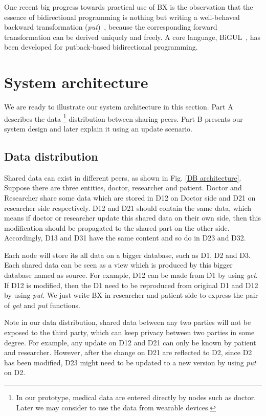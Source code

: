 \documentclass[conference]{IEEEtran}
\begin{document}
	One recent big progress towards practical use of BX is the observation that the essence of bidirectional programming is nothing but writing a well-behaved backward transformation (\emph{put})~\cite{hu2014validity, pacheco2014monadic, pacheco2014biflux}, because the corresponding forward transformation can be derived uniquely and freely. A core language, BiGUL~\cite{bigul}, has been developed for putback-based bidirectional programming.
    
\section{System architecture}
\label{system}
     We are ready to illustrate our system architecture in this section. Part A describes the data \footnote{
	 In our prototype, medical data are entered directly by nodes such as doctor. Later we may consider to use the data from wearable devices.} distribution between sharing peers. Part B presents our system design and later explain it using an update scenario.

\subsection{Data distribution}


Shared data can exist in different peers, as shown in Fig. \ref{DB architecture}. Suppose there are three entities, doctor, researcher and patient. Doctor and Researcher share some data which are stored in D12 on Doctor side and D21 on researcher side respectively. D12 and D21 should contain the same data, which means if doctor or researcher update this shared data on their own side, then this modification should be propagated to the shared part on the other side. Accordingly, D13 and D31 have the same content and so do in D23 and D32.

Each node will store its all data on a bigger database, such as D1, D2 and D3. Each shared data can be seen as a view which is produced by this bigger database named as source. For example, D12 can be made from D1 by using \emph{get}. If D12 is modified, then the D1 need to be reproduced from original D1 and D12 by using \emph{put}. We just write BX in researcher and patient side to express the pair of \emph{get} and \emph{put} functions.

Note in our data distribution, shared data between any two parties will not be exposed to the third party, which can keep privacy between two parties in some degree. For example, any update on D12 and D21 can only be known by patient and researcher. However, after the change on D21 are reflected to D2, since D2 has been modified, D23 might need to be updated to a new version by using \emph{put} on D2.
\end{document}
